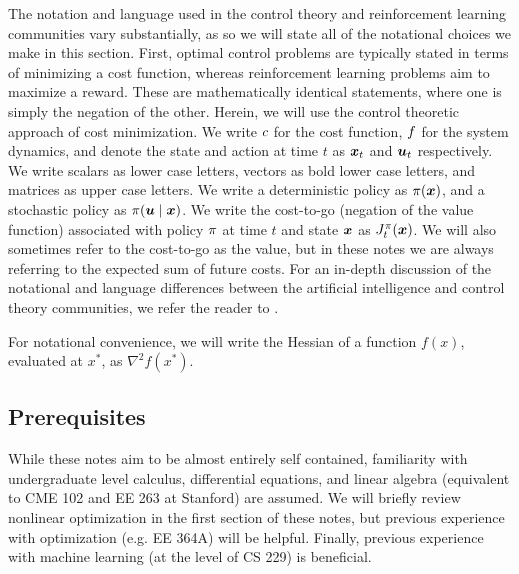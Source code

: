 The notation and language used in the control theory and reinforcement learning communities vary substantially, as so we will state all of the notational choices we make in this section. First, optimal control problems are typically stated in terms of minimizing a cost function, whereas reinforcement learning problems aim to maximize a reward. These are mathematically identical statements, where one is simply the negation of the other. Herein, we will use the control theoretic approach of cost minimization. We write $c$ for the cost function, $f$ for the system dynamics, and denote the state and action at time $t$ as $\bm{x}_t$ and $\bm{u}_t$ respectively. We write scalars as lower case letters, vectors as bold lower case letters, and matrices as upper case letters. We write a deterministic policy as $\pi(\bm{x})$, and a stochastic policy as $\pi(\bm{u}\mid\bm{x})$.
We write the cost-to-go (negation of the value function) associated with policy $\pi$ at time $t$ and state $\bm{x}$ as $J^\pi_t(\bm{x})$. We will also sometimes refer to the cost-to-go as the value, but in these notes we are always referring to the expected sum of future costs. 
For an in-depth discussion of the notational and language differences between the artificial intelligence and control theory communities, we refer the reader to \cite{powell2012ai}.

For notational convenience, we will write the Hessian of a function $f(x)$, evaluated at $x^*$, as $\nabla^2 f(x^*)$.

\subsection*{Prerequisites}

While these notes aim to be almost entirely self contained, familiarity with undergraduate level calculus, differential equations, and linear algebra (equivalent to CME 102 and EE 263 at Stanford) are assumed. We will briefly review nonlinear optimization in the first section of these notes, but previous experience with optimization (e.g. EE 364A) will be helpful. Finally, previous experience with machine learning (at the level of CS 229) is beneficial. 

